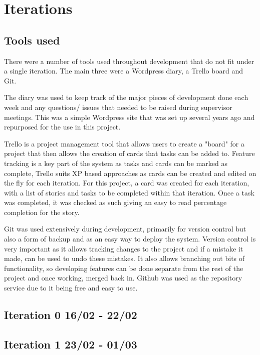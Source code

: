 \chapter{Iterations}
\section{Tools used}
There were a number of tools used throughout development that do not fit under a single iteration. The main three were a Wordpress diary, a Trello board and Git. 

The diary was used to keep track of the major pieces of development done each week and any questions/ issues that needed to be raised during supervisor meetings. This was a simple Wordpress site that was set up several years ago and repurposed for the use in this project.

Trello is a project management tool that allows users to create a "board" for a project that then allows the creation of cards that tasks can be added to\cite{trello}. Feature tracking is a key part of the system as tasks and cards can be marked as complete, Trello suits XP based approaches as cards can be created and edited on the fly for each iteration. For this project, a card was created for each iteration, with a list of stories and tasks to be completed within that iteration. Once a task was completed, it was checked as such giving an easy to read percentage completion for the story.

Git was used extensively during development, primarily for version control but also a form of backup and as an easy way to deploy the system. Version control is very important as it allows tracking changes to the project and if a mistake it made, can be used to undo these mistakes. It also allows branching out bits of functionality, so developing features can be done separate from the rest of the project and once working, merged back in. Github was used as the repository service due to it being free and easy to use\cite{github}.
\newpage

\section{Iteration 0 16/02 - 22/02}


\section{Iteration 1 23/02 - 01/03}


